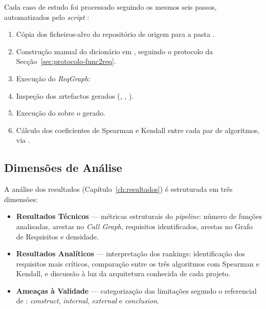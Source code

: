 Cada caso de estudo foi processado seguindo os mesmos seis passos,
automatizados pelo \emph{script} :

\begin{enumerate}
    \item Cópia dos ficheiros-alvo do repositório de origem para a
        pasta .
    \item Construção manual do dicionário  em
        , seguindo o protocolo da
        Secção~\ref{sec:protocolo-func2req}.
    \item Execução do \emph{ReqGraph}:\\
    \item Inspeção dos artefactos gerados
        (, ,
        ).
    \item Execução do  sobre o
         gerado.
    \item Cálculo dos coeficientes de Spearman e Kendall entre cada
        par de algoritmos, via .
\end{enumerate}

\subsection{Dimensões de Análise}
\label{sec:dimensoes}

A análise dos resultados (Capítulo~\ref{ch:resultados}) é
estruturada em três dimensões:

\begin{itemize}
    \item \textbf{Resultados Técnicos} --- métricas estruturais do
        \emph{pipeline}: número de funções analisadas, arestas no
        \emph{Call Graph}, requisitos identificados, arestas no
        Grafo de Requisitos e densidade.
    \item \textbf{Resultados Analíticos} --- interpretação dos
        rankings: identificação dos requisitos mais críticos,
        comparação entre os três algoritmos com Spearman e Kendall,
        e discussão à luz da arquitetura conhecida de cada projeto.
    \item \textbf{Ameaças à Validade} --- categorização das
        limitações segundo o referencial de
        \citet{wohlin2012}: \emph{construct}, \emph{internal},
        \emph{external} e \emph{conclusion}.
\end{itemize}
